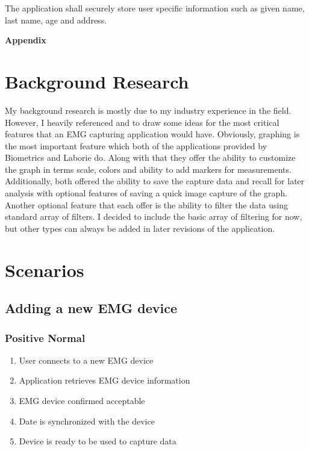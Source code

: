 \documentclass[12pt,a4paper]{article}
\begin{document}
The application shall securely store user specific information such as given name, last name, age and address.

\newpage
\begin{flushleft}
\textbf{{\Large Appendix}}
\end{flushleft}
\appendix
\section{Background Research}

My background research is mostly due to my industry experience in the field. However, I heavily referenced \cite{Biometrics} and \cite{Laborie}
to draw some ideas for the most critical features that an EMG capturing application would have. Obviously, graphing is the most important feature
which both of the applications provided by Biometrics and Laborie do. Along with that they offer the ability to customize the graph in terms scale,
colors and ability to add markers for measurements. Additionally, both offered the ability to save the capture data and recall for later analysis 
with optional features of saving a quick image capture of the graph. Another optional feature that each offer is the ability to filter the data using
standard array of filters. I decided to include the basic array of filtering for now, but other types can always be added in later revisions of the application. 

\newpage

\section{Scenarios}

\subsection{Adding a new EMG device}

\subsubsection{Positive Normal}

\begin{enumerate}
	\item User connects to a new EMG device
	\item Application retrieves EMG device information
	\item EMG device confirmed acceptable
	\item Date is synchronized with the device
	\item Device is ready to be used to capture data
\end{enumerate}
\end{document}

